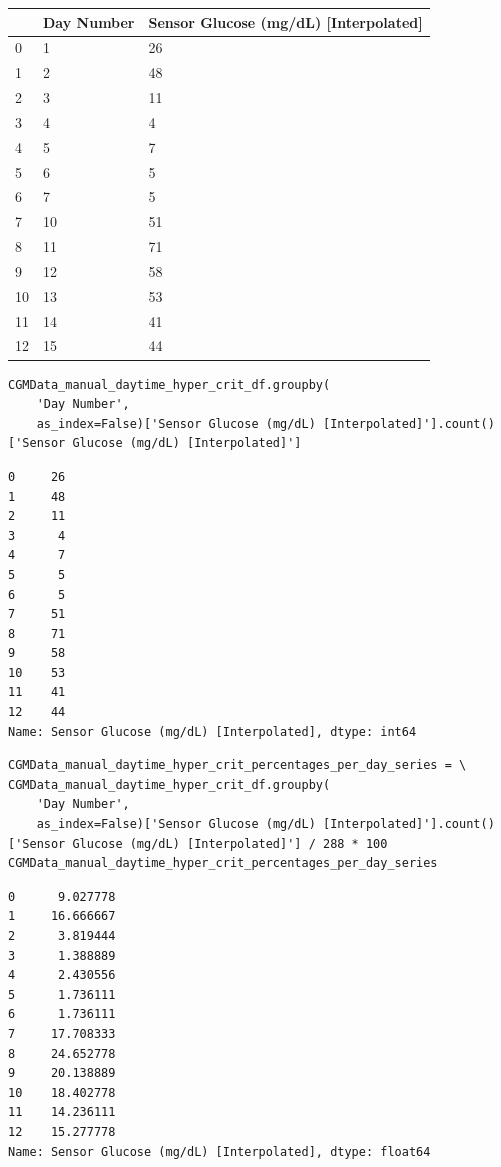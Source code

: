 \bigskip\noindent
\begin{tabular}{p{}p{}p{}}
\toprule
 & Day Number & Sensor Glucose (mg/dL) [Interpolated] \\
\hline
0 & 1 & 26 \\
\hline
1 & 2 & 48 \\
\hline
2 & 3 & 11 \\
\hline
3 & 4 & 4 \\
\hline
4 & 5 & 7 \\
\hline
5 & 6 & 5 \\
\hline
6 & 7 & 5 \\
\hline
7 & 10 & 51 \\
\hline
8 & 11 & 71 \\
\hline
9 & 12 & 58 \\
\hline
10 & 13 & 53 \\
\hline
11 & 14 & 41 \\
\hline
12 & 15 & 44 \\
\hline
\bottomrule
\end{tabular}

\bigskip

\begin{verbatim}
CGMData_manual_daytime_hyper_crit_df.groupby(
    'Day Number', 
    as_index=False)['Sensor Glucose (mg/dL) [Interpolated]'].count()['Sensor Glucose (mg/dL) [Interpolated]']
\end{verbatim}

\begin{verbatim}
0     26
1     48
2     11
3      4
4      7
5      5
6      5
7     51
8     71
9     58
10    53
11    41
12    44
Name: Sensor Glucose (mg/dL) [Interpolated], dtype: int64
\end{verbatim}

\begin{verbatim}
CGMData_manual_daytime_hyper_crit_percentages_per_day_series = \
CGMData_manual_daytime_hyper_crit_df.groupby(
    'Day Number', 
    as_index=False)['Sensor Glucose (mg/dL) [Interpolated]'].count()['Sensor Glucose (mg/dL) [Interpolated]'] / 288 * 100
CGMData_manual_daytime_hyper_crit_percentages_per_day_series
\end{verbatim}

\begin{verbatim}
0      9.027778
1     16.666667
2      3.819444
3      1.388889
4      2.430556
5      1.736111
6      1.736111
7     17.708333
8     24.652778
9     20.138889
10    18.402778
11    14.236111
12    15.277778
Name: Sensor Glucose (mg/dL) [Interpolated], dtype: float64
\end{verbatim}

